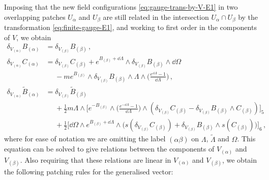 \documentclass[debug]{phd}
\begin{document}
				Imposing that the new field configurations \eqref{eq:gauge-trans-by-V-E1} in two overlapping patches $U_\alpha$ and $U_\beta$ are still related in the intersection $U_\alpha \cap U_\beta$ by the transformation \eqref{eq:finite-gauge-E1}, and working to first order in the components of $V$, we obtain
					\begin{equation}\label{eq:well-defined}
						\begin{split}
							\delta_{V_{(\alpha)}} B_{(\alpha)} &= \delta_{V_{(\beta)}} B_{(\beta)}\,, \\
 							\delta_{V_{(\alpha)}} C_{(\alpha)} &= \delta_{V_{(\beta)}} C_{(\beta)} + e^{ B_{(\beta)} +\dd \Lambda} \wedge \delta_{V_{(\beta)}} B_{(\beta)} \wedge \dd \Omega \\
													&\phantom{=} - m e^{ B_{(\beta)} } \wedge \delta_{V_{(\beta)}} B_{(\beta)} \wedge \Lambda \wedge \big( \tfrac{e^{\dd \Lambda}-1}{\dd \Lambda} \big) \, , \\
							\delta_{V_{(\alpha)}} \tilde{B}_{(\alpha)} & = \delta_{V_{(\beta)}} \tilde{B}_{(\beta)} \\
														&\phantom{=}+ \tfrac{1}{2} m \Lambda \wedge \Big[ e^{-B_{(\beta)} } \wedge \big(\tfrac{ e^{-\dd \Lambda}-1}{\dd \Lambda} \big) \wedge ( \delta_{V_{(\beta)}} C_{(\beta)} - \delta_{V_{(\beta)}} B_{(\beta)} \wedge C_{(\beta)}) \Big]_5 \\
															&\phantom{=} + \tfrac{1}{2} \Big[ \dd \Omega \wedge e^{B_{(\beta)} + \dd \Lambda} \wedge\Big( s( \delta_{V_{(\beta)}} C_{(\beta)}) + \delta_{V_{(\beta)}} B_{(\beta)} \wedge s(C_{(\beta)})\Big) \Big]_6 \, ,
						\end{split}
					\end{equation}
				where for ease of notation we are omitting the label $(\alpha\beta)$ on $\Lambda$, $\tilde\Lambda$ and $\Omega$.
				This equation can be solved to give relations between the components of $V_{(\alpha)}$ and $V_{(\beta)}$. Also requiring that these relations are linear in $V_{(\alpha)}$ and $V_{(\beta)}$, we obtain the following patching rules for the generalised vector: 
\end{document}

